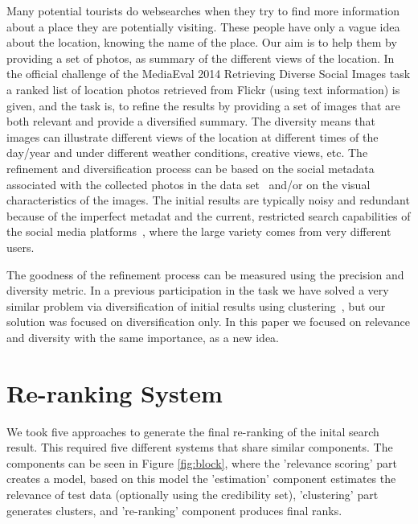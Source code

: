 \documentclass{acm_proc_article-me}
\begin{document}
Many potential tourists do websearches when they try to find more information about a place they are potentially visiting. These people have only a vague idea about the location, knowing the name of the place. Our aim is to help them by providing a set of photos, as summary of the different views of the location. 
In the official challenge of the MediaEval 2014 Retrieving Diverse Social Images task \cite{ionescu2014retrieving} a ranked list of location photos retrieved from Flickr (using text information) is given, and the task is, to refine the results by providing a set of images that are both relevant and provide a diversified summary. The diversity means that images can illustrate different views of the location at different times of the day/year and under different weather conditions, creative views, etc. The refinement and diversification process can be based on the social metadata associated with the collected photos in the data set~\cite{ionescu2014div400} and/or on the visual characteristics of the images. The initial results are typically noisy and redundant because of the imperfect metadat and the current, restricted search capabilities of the social media platforms~\cite{radu2014hybrid}, where the large variety comes from very different users. 

The goodness of the refinement process can be measured using the precision and diversity metric.
In a previous participation in the task we have solved a very similar problem via diversification of initial results using clustering~\cite{szHucs2013bmemtm}, but our solution was focused on diversification only. In this paper we focused on relevance and diversity with the same importance, as a new idea.

\pagebreak
\section{Re-ranking System}

We took five approaches to generate the final re-ranking of the inital search result. This required five different systems that share similar components. The components can be seen in Figure \ref{fig:block}, where the 'relevance scoring' part creates a model, based on this model the 'estimation' component estimates the relevance of test data (optionally using the credibility set), 'clustering' part generates clusters, and 're-ranking' component produces final ranks.
\end{document}
